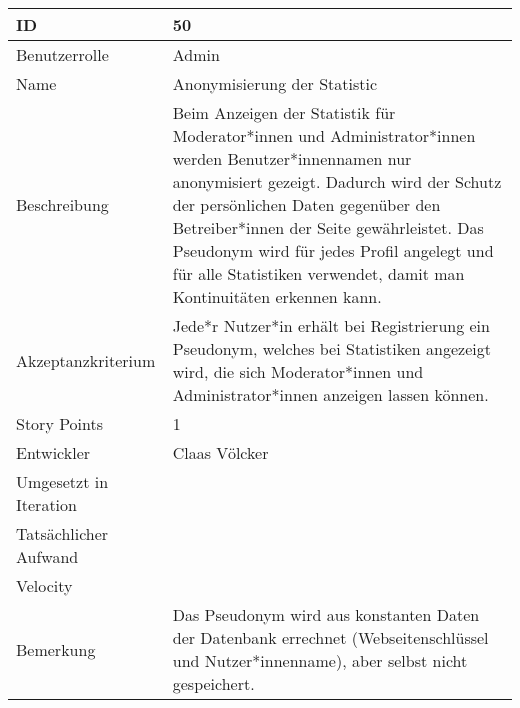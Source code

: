 \begin{tabularx}{\textwidth}{|p{}|X|}
	\hline
	ID & 50\\
	\hline
	Benutzerrolle & Admin\\
	\hline
	Name & Anonymisierung der Statistic\\
	\hline
	Beschreibung & Beim Anzeigen der Statistik für Moderator*innen und Administrator*innen werden Benutzer*innennamen nur anonymisiert gezeigt. Dadurch wird der Schutz der persönlichen Daten gegenüber den Betreiber*innen der Seite gewährleistet. Das Pseudonym wird für jedes Profil angelegt und für alle Statistiken verwendet, damit man Kontinuitäten erkennen kann.\\
	\hline
	Akzeptanzkriterium & Jede*r Nutzer*in erhält bei Registrierung ein Pseudonym, welches bei Statistiken angezeigt wird, die sich Moderator*innen und Administrator*innen anzeigen lassen können.\\
	\hline
	Story Points & 1\\
	\hline
	Entwickler & Claas Völcker\\
	\hline
	Umgesetzt in Iteration & \\ 
	\hline
	Tatsächlicher Aufwand & \\
	\hline
	Velocity & \\
	\hline
	Bemerkung & Das Pseudonym wird aus konstanten Daten der Datenbank errechnet (Webseitenschlüssel und Nutzer*innenname), aber selbst nicht gespeichert.\\
	\hline
\end{tabularx}
\vspace{20pt}
